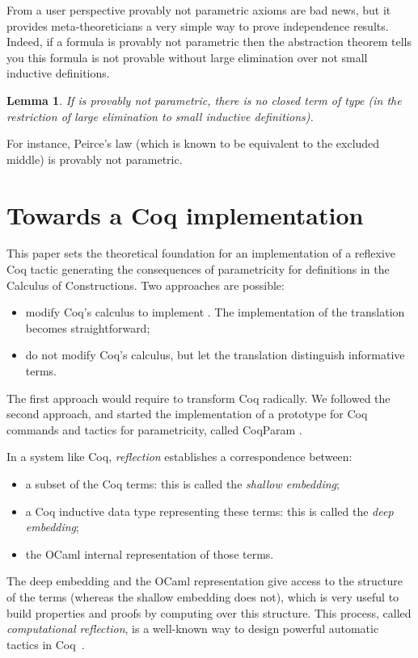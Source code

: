 \documentclass[a4paper,USenglish]{lipics}
\newtheorem{lem}{Lemma}
\def\coq{\textsf{Coq}\xspace}
\def\cicr{\xspace}
\def\ocaml{\textsf{OCaml}\xspace}
\def\coqparam{\textsf{CoqParam}\xspace}
\begin{document}
From a user perspective provably not parametric axioms are bad news, but
it provides meta-theoreticians a very simple way to prove independence results.
Indeed, if a formula is provably not parametric then the abstraction theorem
tells you this formula is not provable without large elimination over
not small inductive definitions.

\begin{lem}
  If  is provably not parametric, there is no closed term
   of type  (in the restriction of large elimination to small
  inductive definitions).
\end{lem}

For instance, Peirce's law  
(which is known to be equivalent to the
 excluded middle) is provably not parametric.


\section{Towards a \coq implementation}\label{sec:tactic}

This paper sets the theoretical foundation for an implementation of a
reflexive \coq tactic generating the consequences of parametricity for
definitions in the Calculus of Constructions. Two approaches are
possible:
\begin{itemize}
\item modify \coq's calculus to implement \cicr. The implementation of
  the translation becomes straightforward;
\item do not modify \coq's calculus, but let the translation distinguish
  informative terms.
\end{itemize}
The first approach would require to transform \coq radically. We followed
the second approach, and started the implementation of a prototype for
\coq commands and tactics for parametricity, called \coqparam
\cite{implem12}.

In a system like \coq, \emph{reflection} establishes a correspondence
between:
\begin{itemize}
\item a subset of the \coq terms: this is called the \emph{shallow
    embedding};
\item a \coq inductive data type representing these terms: this is
  called the \emph{deep embedding};
\item the \ocaml internal representation of those terms.
\end{itemize}
The deep embedding and the \ocaml representation give access to the
structure of the terms (whereas the shallow embedding does not), which
is very useful to build properties and proofs by computing over this
structure. This process, called \emph{computational reflection}, is a
well-known way to design powerful automatic tactics in
\coq~\cite{DBLP:conf/tphol/GregoireM05,GregoireTW06,DBLP:conf/cpp/ArmandFGKTW11}.
\end{document}
